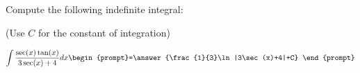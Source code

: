 \documentclass{ximera}
\author{Jim Talamo}
\begin{document}
\begin{exercise}
Compute the following indefinite integral:

\begin{prompt} (Use $C$ for the constant of integration) \end{prompt}

\[
\int \frac{\sec(x)\tan(x)}{3\sec(x) +4} dx 
\begin{prompt}=\answer{\frac{1}{3}\ln|3\sec(x)+4|+C} \end{prompt}
\]
\end{exercise}
\end{document}
